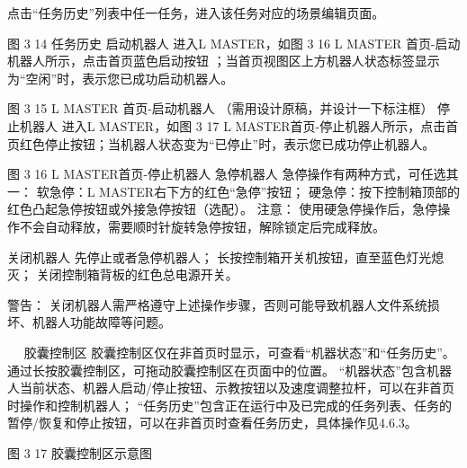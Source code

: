点击“任务历史”列表中任一任务，进入该任务对应的场景编辑页面。
 
图 3 14 任务历史
启动机器人
进入L MASTER，如图 3 16 L MASTER 首页-启动机器人所示，点击首页蓝色启动按钮 ；当首页视图区上方机器人状态标签显示为“空闲”时，表示您已成功启动机器人。

 
 
图 3 15 L MASTER 首页-启动机器人
（需用设计原稿，并设计一下标注框）
停止机器人
进入L MASTER，如图 3 17  L MASTER首页-停止机器人所示，点击首页红色停止按钮；当机器人状态变为“已停止”时，表示您已成功停止机器人。

 
图 3 16  L MASTER首页-停止机器人
急停机器人
急停操作有两种方式，可任选其一：
软急停：L MASTER右下方的红色“急停”按钮；
硬急停：按下控制箱顶部的红色凸起急停按钮或外接急停按钮（选配）。
 	注意：
使用硬急停操作后，急停操作不会自动释放，需要顺时针旋转急停按钮，解除锁定后完成释放。

关闭机器人
	先停止或者急停机器人；
	长按控制箱开关机按钮，直至蓝色灯光熄灭；
	关闭控制箱背板的红色总电源开关。

 	警告：
关闭机器人需严格遵守上述操作步骤，否则可能导致机器人文件系统损坏、机器人功能故障等问题。

 
胶囊控制区
胶囊控制区仅在非首页时显示，可查看“机器状态”和“任务历史”。通过长按胶囊控制区，可拖动胶囊控制区在页面中的位置。
“机器状态”包含机器人当前状态、机器人启动/停止按钮、示教按钮以及速度调整拉杆，可以在非首页时操作和控制机器人；
“任务历史”包含正在运行中及已完成的任务列表、任务的暂停/恢复和停止按钮，可以在非首页时查看任务历史，具体操作见4.6.3。

 
图 3 17 胶囊控制区示意图